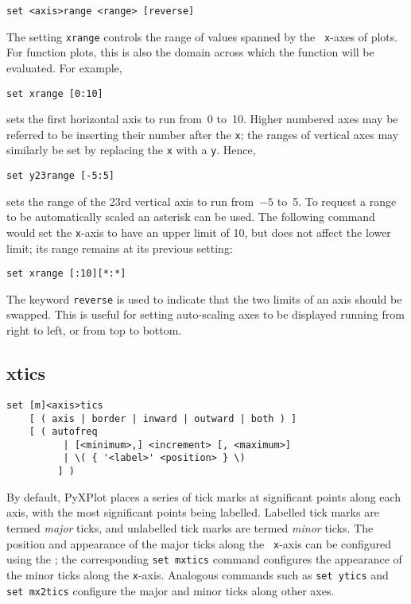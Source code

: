 \begin{verbatim}
set <axis>range <range> [reverse]
\end{verbatim}

The setting {\tt xrange} controls the range of values spanned by the {\tt
x}-axes of plots.  For function plots, this is also the domain across which the
function will be evaluated.  For example,

\begin{verbatim}
set xrange [0:10]
\end{verbatim}

\noindent sets the first horizontal axis to run from~0 to~10.  Higher numbered
axes may be referred to be inserting their number after the {\tt x}; the ranges
of vertical axes may similarly be set by replacing the {\tt x} with a {\tt y}.
Hence,

\begin{verbatim}
set y23range [-5:5]
\end{verbatim}

\noindent sets the range of the 23rd vertical axis to run from~$-5$ to~5.  To
request a range to be automatically scaled an asterisk can be used.  The
following command would set the {\tt x}-axis to have an upper limit of 10, but
does not affect the lower limit; its range remains at its previous setting:

\begin{verbatim}
set xrange [:10][*:*]
\end{verbatim}

The keyword {\tt reverse} is used to indicate that the two limits of an axis
should be swapped. This is useful for setting auto-scaling axes to be displayed
running from right to left, or from top to bottom.


\subsection{xtics}

\begin{verbatim}
set [m]<axis>tics
    [ ( axis | border | inward | outward | both ) ]
    [ ( autofreq
          | [<minimum>,] <increment> [, <maximum>]
          | \( { '<label>' <position> } \)
         ] )
\end{verbatim}

By default, PyXPlot places a series of tick marks at significant points along
each axis, with the most significant points being labelled.  Labelled tick
marks are termed {\it major} ticks, and unlabelled tick marks are termed {\it
minor} ticks.  The position and appearance of the major ticks along the {\tt
x}-axis can be configured using the ; the corresponding
{\tt set mxtics} command configures the appearance of the minor ticks along the
{\tt x}-axis. Analogous commands such as {\tt set ytics} and {\tt set mx2tics}
configure the major and minor ticks along other axes.

